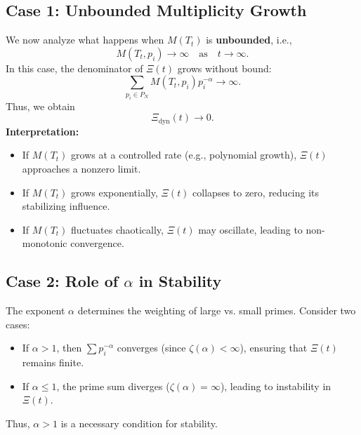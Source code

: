 \documentclass[12pt]{article}
\begin{document}
\subsection{Case 1: Unbounded Multiplicity Growth}
We now analyze what happens when \( M(T_t) \) is \textbf{unbounded}, i.e.,
\begin{equation}
    M(T_t, p_i) \to \infty \quad \text{as} \quad t \to \infty.
\end{equation}
In this case, the denominator of \(\Xi(t) \) grows without bound:
\begin{equation}
    \sum_{p_i \in P_N} M(T_t, p_i) p_i^{-\alpha} \to \infty.
\end{equation}
Thus, we obtain
\begin{equation}
    \Xi_{\text{dyn}}(t) \to 0.
\end{equation}
\textbf{Interpretation:}
\begin{itemize}
    \item If \( M(T_t) \) grows at a controlled rate (e.g., polynomial growth), \(\Xi(t) \) approaches a nonzero limit.
    \item If \( M(T_t) \) grows exponentially, \(\Xi(t) \) collapses to zero, reducing its stabilizing influence.
    \item If \( M(T_t) \) fluctuates chaotically, \(\Xi(t) \) may oscillate, leading to non-monotonic convergence.
\end{itemize}

\subsection{Case 2: Role of \( \alpha \) in Stability}
The exponent \( \alpha \) determines the weighting of large vs. small primes. Consider two cases:
\begin{itemize}
    \item If \( \alpha > 1 \), then \( \sum p_i^{-\alpha} \) converges (since \( \zeta(\alpha) < \infty \)), ensuring that \(\Xi(t) \) remains finite.
    \item If \( \alpha \leq 1 \), the prime sum diverges (\( \zeta(\alpha) = \infty \)), leading to instability in \(\Xi(t) \).
\end{itemize}
Thus, \( \alpha > 1 \) is a necessary condition for stability.
\end{document}
